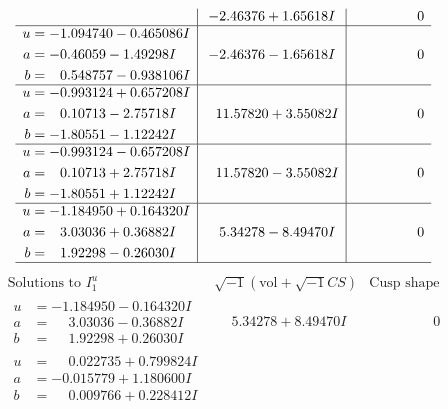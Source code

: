 \documentclass[1p]{elsarticle_modified}
\theoremstyle{definition}
\newcommand{\I}{\sqrt{-1}}
\begin{document}
$$\begin{array}{c|c|c}
 & -2.46376 + 1.65618 I & \phantom{-0.000000 } 0 \\ \hline\begin{aligned}
u &= -1.094740 - 0.465086 I \\
a &= -0.46059 - 1.49298 I \\
b &= \phantom{-}0.548757 - 0.938106 I\end{aligned}
 & -2.46376 - 1.65618 I & \phantom{-0.000000 } 0 \\ \hline\begin{aligned}
u &= -0.993124 + 0.657208 I \\
a &= \phantom{-}0.10713 - 2.75718 I \\
b &= -1.80551 - 1.12242 I\end{aligned}
 & \phantom{-}11.57820 + 3.55082 I & \phantom{-0.000000 } 0 \\ \hline\begin{aligned}
u &= -0.993124 - 0.657208 I \\
a &= \phantom{-}0.10713 + 2.75718 I \\
b &= -1.80551 + 1.12242 I\end{aligned}
 & \phantom{-}11.57820 - 3.55082 I & \phantom{-0.000000 } 0 \\ \hline\begin{aligned}
u &= -1.184950 + 0.164320 I \\
a &= \phantom{-}3.03036 + 0.36882 I \\
b &= \phantom{-}1.92298 - 0.26030 I\end{aligned}
 & \phantom{-}5.34278 - 8.49470 I & \phantom{-0.000000 } 0\\
 \hline 
 \end{array}$$\newpage$$\begin{array}{c|c|c}  
\text{Solutions to }I^u_{1}& \I (\text{vol} + \sqrt{-1}CS) & \text{Cusp shape}\\
 \hline 
\begin{aligned}
u &= -1.184950 - 0.164320 I \\
a &= \phantom{-}3.03036 - 0.36882 I \\
b &= \phantom{-}1.92298 + 0.26030 I\end{aligned}
 & \phantom{-}5.34278 + 8.49470 I & \phantom{-0.000000 } 0 \\ \hline\begin{aligned}
u &= \phantom{-}0.022735 + 0.799824 I \\
a &= -0.015779 + 1.180600 I \\
b &= \phantom{-}0.009766 + 0.228412 I\end{aligned}

\end{array}$$
\end{document}
